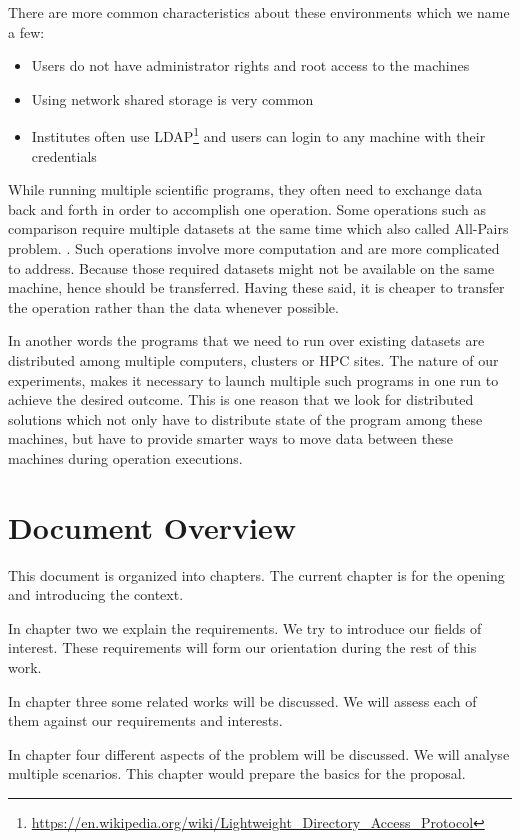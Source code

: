 There are more common characteristics about these environments which we name a few:
\begin{itemize}
\item Users do not have administrator rights and root access to the machines
\item Using network shared storage is very common
\item Institutes often use LDAP\footnote{\url{https://en.wikipedia.org/wiki/Lightweight_Directory_Access_Protocol}} 
and users can login to any machine with their credentials
\end{itemize}

While running multiple scientific programs, they often need to exchange data back and forth in order to accomplish one operation.
Some operations such as comparison require multiple datasets at the same time which also called All-Pairs problem. \cite{moretti08}. 
Such operations involve more computation and are more complicated to address. Because those required datasets 
might not be available on the same machine, hence should be transferred. 
Having these said, it is cheaper to transfer the operation rather than the data whenever possible. 

In another words the programs that we need to run over existing datasets are distributed among multiple
computers, clusters or HPC sites. The nature of our experiments, makes it necessary to launch
multiple such programs in one run to achieve the desired outcome. This is one reason that we look
for distributed solutions which not only have to distribute state of the program among these machines,
but have to provide smarter ways to move data between these machines during operation executions.

\section{Document Overview}
This document is organized into  chapters. 
The current chapter is for the opening and introducing the context.

In chapter two we explain the requirements. We try to introduce our fields of interest. 
These requirements will form our orientation during the rest of this work.

In chapter three some related works will be discussed. 
We will assess each of them against our requirements and interests.

In chapter four different aspects of the problem will be discussed. 
We will analyse multiple scenarios. This chapter would prepare the basics for the proposal.

